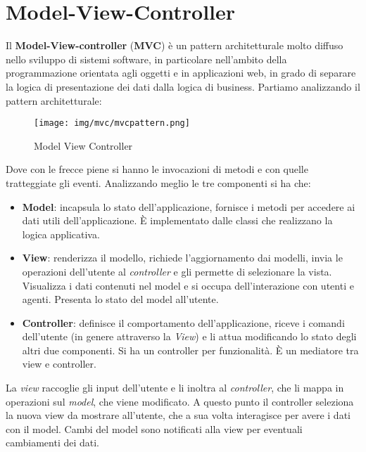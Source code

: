 \chapter{Model-View-Controller}
Il \textbf{Model-View-controller} (\textbf{MVC}) è un pattern architetturale
molto diffuso nello sviluppo di sistemi software, in particolare nell'ambito
della programmazione orientata agli oggetti e in applicazioni web, in grado di
separare la logica di presentazione dei dati dalla logica di business. Partiamo
analizzando il pattern architetturale:
\begin{figure}[!ht]
      \centering
      \texttt{[image: img/mvc/mvcpattern.png]}
      \caption{Model View Controller}
      \label{fig:enter-label}
\end{figure}
Dove con le frecce piene si hanno le invocazioni di metodi e con quelle
tratteggiate gli eventi. Analizzando meglio le tre componenti si ha che:
\begin{itemize}
      \item \textbf{Model}: incapsula lo stato dell'applicazione, fornisce i
            metodi per accedere ai dati utili dell'applicazione. È implementato
            dalle classi che realizzano la logica applicativa.
      \item \textbf{View}: renderizza il modello, richiede l'aggiornamento dai
            modelli, invia le operazioni dell'utente al \textit{controller} e
            gli permette di selezionare la vista. Visualizza i dati contenuti
            nel model e si occupa dell'interazione con utenti e agenti. Presenta
            lo stato del model all'utente.
      \item \textbf{Controller}: definisce il comportamento dell'applicazione,
            riceve i comandi dell'utente (in genere attraverso la \textit{View})
            e li attua modificando lo stato degli altri due componenti. Si ha un
            controller per funzionalità. È un mediatore tra view e controller.
\end{itemize}
La \textit{view} raccoglie gli input dell'utente e li inoltra al \textit{controller},
che li mappa in operazioni sul \textit{model}, che viene modificato. A questo
punto il controller seleziona la nuova view da mostrare all'utente, che a sua
volta interagisce per avere i dati con il model. Cambi del model sono notificati
alla view per eventuali cambiamenti dei dati.

